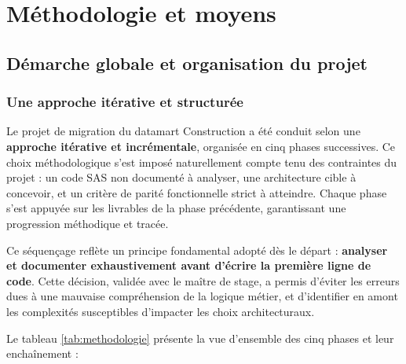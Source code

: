 \chapter{Méthodologie et moyens}

\section{Démarche globale et organisation du projet}

\subsection{Une approche itérative et structurée}

Le projet de migration du datamart Construction a été conduit selon une \textbf{approche itérative et incrémentale}, organisée en cinq phases successives. Ce choix méthodologique s'est imposé naturellement compte tenu des contraintes du projet : un code SAS non documenté à analyser, une architecture cible à concevoir, et un critère de parité fonctionnelle strict à atteindre. Chaque phase s'est appuyée sur les livrables de la phase précédente, garantissant une progression méthodique et tracée.

Ce séquençage reflète un principe fondamental adopté dès le départ : \textbf{analyser et documenter exhaustivement avant d'écrire la première ligne de code}. Cette décision, validée avec le maître de stage, a permis d'éviter les erreurs dues à une mauvaise compréhension de la logique métier, et d'identifier en amont les complexités susceptibles d'impacter les choix architecturaux.

Le tableau \ref{tab:methodologie} présente la vue d'ensemble des cinq phases et leur enchaînement :

